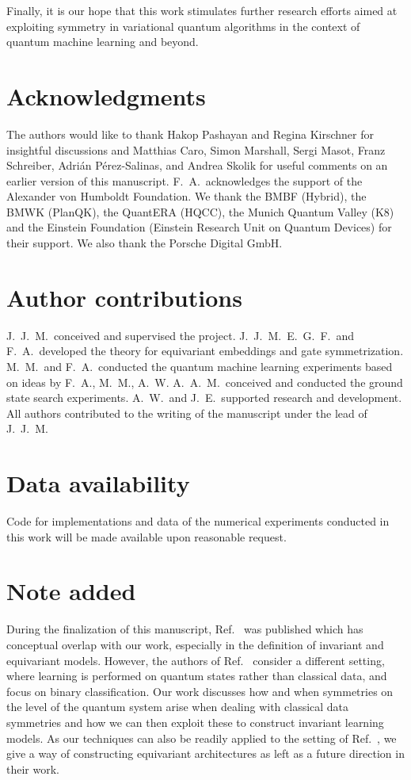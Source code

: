 \documentclass[a4paper,twocolumn,notitlepage,nofootinbib,superscriptaddress,floatfix]{revtex4-2}
\begin{document}
Finally, it is our hope that this work stimulates further research efforts aimed at exploiting symmetry in variational quantum algorithms in the context of quantum machine learning and beyond.


\section*{Acknowledgments}
The authors would like to thank Hakop Pashayan and Regina Kirschner for insightful discussions and Matthias Caro, Simon Marshall, Sergi Masot, Franz Schreiber, Adri\'an P\'erez-Salinas, and Andrea Skolik for useful comments on an earlier version of this manuscript.
F.~A.\ acknowledges the support of the Alexander von Humboldt Foundation. We thank the BMBF (Hybrid), the BMWK (PlanQK), the QuantERA (HQCC), the Munich Quantum Valley (K8) and the Einstein Foundation (Einstein Research Unit on Quantum Devices) for their support. We also thank the Porsche Digital GmbH. 

\section*{Author contributions}
J.~J.~M.\ conceived and supervised the project. J.~J.~M.\, E.~G.~F.\ and F.~A.\ developed the theory for equivariant embeddings and gate symmetrization. M.~M.\ and F.~A.\ conducted the quantum machine learning experiments based on ideas by F.~A., M.~M., A.~W. A.~A.~M.\ conceived and conducted the ground state search experiments. A.~W.\ and J.~E.\ supported research and development. All authors contributed to the writing of the manuscript under the lead of J.~J.~M.

\section*{Data availability}
Code for implementations and data of the numerical experiments conducted in this work will be made available upon reasonable request.

\section*{Note added}
During the finalization of this manuscript, Ref.~\cite{larocca2022group-invariant} was published which has conceptual overlap with our work, especially in the definition of invariant and equivariant models. However, the authors of Ref.~\cite{larocca2022group-invariant} consider a different setting, where learning is performed on quantum states rather than classical data, and focus on binary classification. Our work discusses how and when symmetries on the level of the quantum system arise when dealing with classical data symmetries and how we can then exploit these to construct invariant learning models. As our techniques can also be readily applied to the setting of Ref.~\cite{larocca2022group-invariant}, we give a way of constructing equivariant architectures as left as a future direction in their work.
\end{document}
